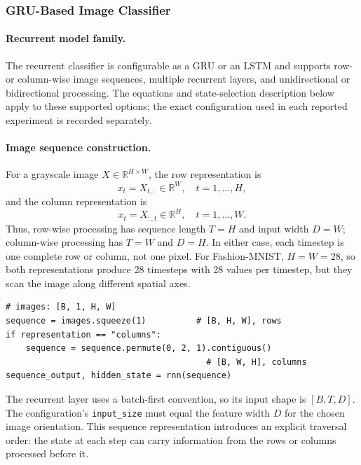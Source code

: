 \documentclass[11pt,a4paper]{article}
\begin{document}
\setcounter{subsubsection}{3}
\subsubsection{GRU-Based Image Classifier}
\label{sec:rnn-method}

\paragraph{Recurrent model family.} The recurrent classifier is configurable as a GRU or an LSTM and supports row- or column-wise image sequences, multiple recurrent layers, and unidirectional or bidirectional processing. The equations and state-selection description below apply to these supported options; the exact configuration used in each reported experiment is recorded separately.

\paragraph{Image sequence construction.} For a grayscale image \(X\in\mathbb{R}^{H\times W}\), the row representation is
\[
x_t=X_{t,:}\in\mathbb{R}^{W},\quad t=1,\ldots,H,
\]
and the column representation is
\[
x_t=X_{:,t}\in\mathbb{R}^{H},\quad t=1,\ldots,W.
\]
Thus, row-wise processing has sequence length \(T=H\) and input width \(D=W\); column-wise processing has \(T=W\) and \(D=H\). In either case, each timestep is one complete row or column, not one pixel. For Fashion-MNIST, \(H=W=28\), so both representations produce 28 timesteps with 28 values per timestep, but they scan the image along different spatial axes.

\begin{lstlisting}[caption={Image-to-sequence conversion for row or column processing.},label={lst:rnn-input}]
# images: [B, 1, H, W]
sequence = images.squeeze(1)          # [B, H, W], rows
if representation == "columns":
    sequence = sequence.permute(0, 2, 1).contiguous()
                                        # [B, W, H], columns
sequence_output, hidden_state = rnn(sequence)
\end{lstlisting}

The recurrent layer uses a batch-first convention, so its input shape is \([B,T,D]\). The configuration's \texttt{input\_size} must equal the feature width \(D\) for the chosen image orientation. This sequence representation introduces an explicit traversal order: the state at each step can carry information from the rows or columns processed before it.
\end{document}
